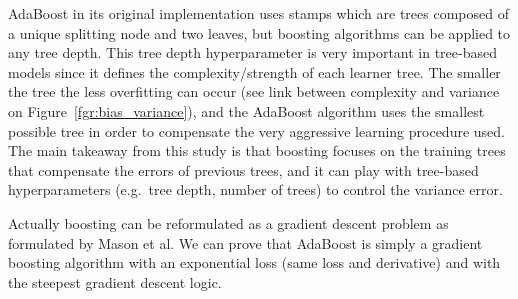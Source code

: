 \documentclass[main]{subfiles}
\begin{document}
AdaBoost in its original implementation uses stamps which are trees composed of a unique splitting node and two leaves, but boosting algorithms can be applied to any tree depth. This tree depth hyperparameter is very important in tree-based models since it defines the complexity/strength of each learner tree. The smaller the tree the less overfitting can occur (see link between complexity and variance on Figure~\ref{fgr:bias_variance}), and the AdaBoost algorithm uses the smallest possible tree in order to compensate the very aggressive learning procedure used. The main takeaway from this study is that boosting focuses on the training trees that compensate the errors of previous trees, and it can play with tree-based hyperparameters (e.g.\ tree depth, number of trees) to control the variance error.

Actually boosting can be reformulated as a gradient descent problem as formulated by Mason et al.\autocite{mason1999boosting} We can prove that AdaBoost is simply a gradient boosting algorithm with an exponential loss (same loss and derivative) and with the steepest gradient descent logic.\autocite{mason1999boosting,azencott2022introduction} 
\end{document}
